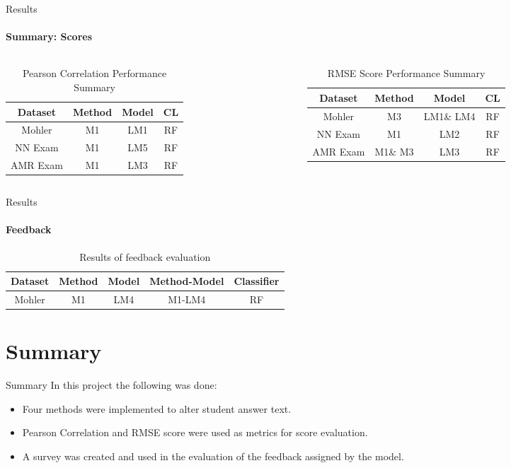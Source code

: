 \documentclass[aspectratio=169]{beamer}
\begin{document}
\begin{frame}{Results}
	\framesubtitle{Summary: Scores}
	\begin{columns}
		\begin{column}{0.5\textwidth}
			\begin{table}
				\centering
				\begin{tabular}{|c|c|c|c|}
					\hline
					Dataset & Method & Model & CL \\
					\hline
					Mohler & M1 & LM1& RF \\
					\hline
					NN Exam & M1 & LM5 & RF\\
					\hline
					AMR Exam & M1& LM3 & RF\\
					\hline	
				\end{tabular}
			\caption{Pearson Correlation Performance Summary}
			\end{table}
		\end{column}
		\begin{column}{0.5\textwidth}
			\begin{table}
			\centering
			\begin{tabular}{|c|c|c|c|}
				\hline
				Dataset & Method & Model & CL \\
				\hline
				Mohler & M3 & LM1\& LM4& RF \\
				\hline
				NN Exam & M1 & LM2 & RF\\
				\hline
				AMR Exam & M1\& M3 & LM3 & RF\\
				\hline	
			\end{tabular}
			\caption{RMSE Score Performance Summary}
		\end{table}
		\end{column}
	\end{columns}
\end{frame}
\begin{frame}{Results}
	\framesubtitle{Feedback}
	\begin{table}
		\centering
		\begin{tabular}{|c|c|c|c|c|}
			\hline
			Dataset & Method & Model & Method-Model & Classifier \\
			\hline
			Mohler & M1 & LM4 & M1-LM4 & RF \\
			\hline
		\end{tabular}
	\caption{Results of feedback evaluation}
	\end{table}
\end{frame}
\section{Summary}
\begin{frame}{Summary}
In this project the following was done:
	\begin{itemize}
		
		\item Four methods were implemented to alter student answer text.
		\item Pearson Correlation and RMSE score were used as metrics for score evaluation.
		\item A survey was created and used in the evaluation of the feedback assigned by the model.
	\end{itemize}
\end{frame}
\end{document}
